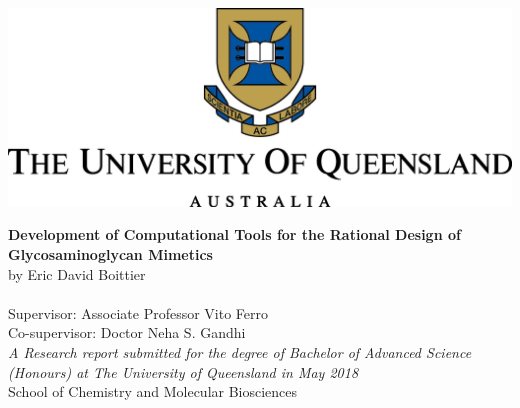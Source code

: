 \documentclass[a4paper, 12pt, openany]{book}
\begin{document}
\begin{titlepage}
\begin{center}

\vspace*{3cm}
\renewcommand{\thefootnote}{\fnsymbol{footnote}}

\includegraphics[]{pictures/PNGLogo.png}
\vspace{0.2cm}


\vspace{2cm}
\textbf{\LARGE{Development of Computational Tools for the Rational Design of Glycosaminoglycan Mimetics}} \\

by Eric David Boittier \\

\vspace{0.5cm}
\\
Supervisor: Associate Professor Vito Ferro
\\
Co-supervisor: Doctor Neha S. Gandhi
\\
\vspace{3cm}
\textit{A	Research report submitted for	the	degree	of	Bachelor of	Advanced Science	(Honours)	at
The	University	of	Queensland	in	May	2018}
\\School	of	Chemistry	and	Molecular	Biosciences
\end{center}
\end{titlepage}


\newpage



	
\end{document}
